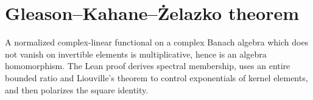 \section{Gleason--Kahane--\.{Z}elazko theorem}

\begin{theorem}
\label{thm:gkz}
\leanok
A normalized complex-linear functional on a complex Banach algebra which does not vanish on invertible elements is multiplicative, hence is an algebra homomorphism. The Lean proof derives spectral membership, uses an entire bounded ratio and Liouville's theorem to control exponentials of kernel elements, and then polarizes the square identity.
\end{theorem}
